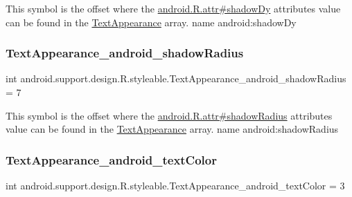 This symbol is the offset where the \hyperlink{}{android.\+R.\+attr\#shadow\+Dy} attribute\textquotesingle{}s value can be found in the \hyperlink{classandroid_1_1support_1_1design_1_1R_1_1styleable_a23dc46ec989f92f528b46568dad7e726}{Text\+Appearance} array.  name android\+:shadow\+Dy \mbox{\label{classandroid_1_1support_1_1design_1_1R_1_1styleable_aadd2af965093afd5bbd56af5349e534d}} 
\subsubsection{\texorpdfstring{Text\+Appearance\+\_\+android\+\_\+shadow\+Radius}{TextAppearance\_android\_shadowRadius}}
{\footnotesize\ttfamily int android.\+support.\+design.\+R.\+styleable.\+Text\+Appearance\+\_\+android\+\_\+shadow\+Radius = 7\hspace{0.3cm}{\ttfamily [static]}}

This symbol is the offset where the \hyperlink{}{android.\+R.\+attr\#shadow\+Radius} attribute\textquotesingle{}s value can be found in the \hyperlink{classandroid_1_1support_1_1design_1_1R_1_1styleable_a23dc46ec989f92f528b46568dad7e726}{Text\+Appearance} array.  name android\+:shadow\+Radius \mbox{\label{classandroid_1_1support_1_1design_1_1R_1_1styleable_a94894b984b558f8b9a8b6fab3346043b}} 
\subsubsection{\texorpdfstring{Text\+Appearance\+\_\+android\+\_\+text\+Color}{TextAppearance\_android\_textColor}}
{\footnotesize\ttfamily int android.\+support.\+design.\+R.\+styleable.\+Text\+Appearance\+\_\+android\+\_\+text\+Color = 3\hspace{0.3cm}{\ttfamily [static]}}

